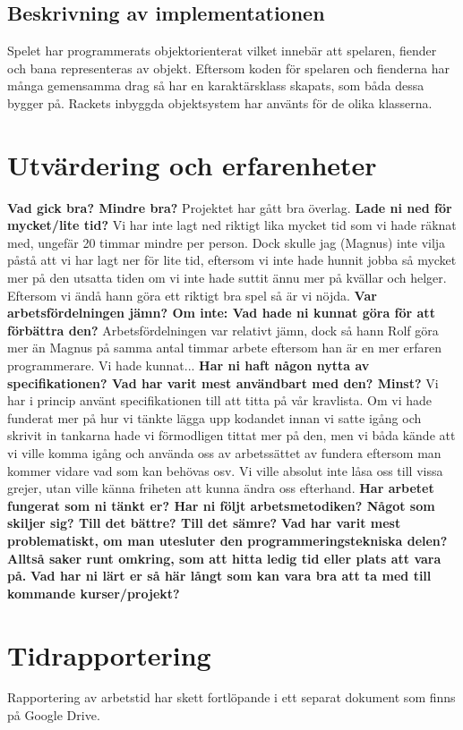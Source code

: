 \documentclass{scrartcl}
\begin{document}
\subsection{Beskrivning av implementationen}
Spelet har programmerats objektorienterat vilket innebär att spelaren, fiender och bana representeras av objekt. Eftersom koden för spelaren och fienderna har många gemensamma drag så har en karaktärsklass skapats, som båda dessa bygger på. Rackets inbyggda objektsystem har använts för de olika klasserna.  
\section{Utvärdering och erfarenheter}


\textbf{Vad gick bra? Mindre bra?}
Projektet har gått bra överlag. 
\textbf{Lade ni ned för mycket/lite tid?}
Vi har inte lagt ned riktigt lika mycket tid som vi hade räknat med, ungefär 20 timmar mindre per person. Dock skulle jag (Magnus) inte vilja påstå att vi har lagt ner för lite tid, eftersom vi inte hade hunnit jobba så mycket mer på den utsatta tiden om vi inte hade suttit ännu mer på kvällar och helger. Eftersom vi ändå hann göra ett riktigt bra spel så är vi nöjda. 
\textbf{Var arbetsfördelningen jämn? Om inte: Vad hade ni kunnat göra för att förbättra den?}
Arbetsfördelningen var relativt jämn, dock så hann Rolf göra mer än Magnus på samma antal timmar arbete eftersom han är en mer erfaren programmerare. Vi hade kunnat...
\textbf{Har ni haft någon nytta av specifikationen? Vad har varit mest användbart med den? Minst?}
Vi har i princip använt specifikationen till att titta på vår kravlista. Om vi hade funderat mer på hur vi tänkte lägga upp kodandet innan vi satte igång och skrivit in tankarna hade vi förmodligen tittat mer på den, men vi båda kände att vi ville komma igång och använda oss av arbetssättet av fundera eftersom man kommer vidare vad som kan behövas osv. Vi ville absolut inte låsa oss till vissa grejer, utan ville känna friheten att kunna ändra oss efterhand. 
\textbf{Har arbetet fungerat som ni tänkt er? Har ni följt arbetsmetodiken? Något som skiljer sig? Till det bättre? Till det sämre?}
\textbf{Vad har varit mest problematiskt, om man utesluter den programmeringstekniska delen? Alltså saker runt omkring, som att hitta ledig tid eller plats att vara på.}
\textbf{Vad har ni lärt er så här långt som kan vara bra att ta med till kommande kurser/projekt?}

\section{Tidrapportering}
Rapportering av arbetstid har skett fortlöpande i ett separat dokument som finns på Google Drive.
\end{document}
